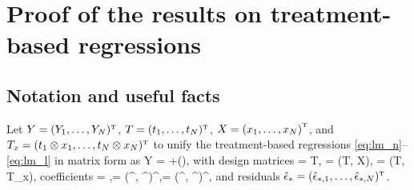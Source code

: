 \documentclass[11pt]{article}
\theoremstyle{definition}
\begin{document}
%
\section{Proof of the results on treatment-based regressions}\label{sec:ols_app}
%
\subsection{Notation and useful facts}\label{sec:ols_app_notation}
%
%
%
%
Let 
$Y = (Y_1, \dots, Y_N)^{ \mathrm{\scriptscriptstyle T} }$, $ T  = ( t_1,\dots, t_N)^{ \mathrm{\scriptscriptstyle T} }$, $ X =  \left(  x _{1},\dots, x_N \right)^{ \mathrm{\scriptscriptstyle T} }$, and $T_x =(t_1 \otimes x_1, \dots, t_N \otimes x_N )^{ \mathrm{\scriptscriptstyle T} }$
 to unify the treatment-based regressions \eqref{eq:lm_n}--\eqref{eq:lm_l} in matrix form as 
\begina
Y = \mss \hths +\heps \qquad (\ms),
\enda
with design matrices
\begina
\cnn  = T, \qquad \cff  = (T, X), \qquad \cll  = (T, T_x), 
\enda
\olss coefficients 
\begina
 \hthn = \hyn,\qquad\hthf = (\hyf^\T, \hbf ^\T)^\T,\qquad  \hthl = (\hyl^\T, \hbl^\T )^\T,
\enda
and residuals $\hat\epsilon_* = (\hat\epsilon_{*,1}, \ldots, \hat\epsilon_{*, N})^{ \mathrm{\scriptscriptstyle T} }$. 
%
\end{document}
